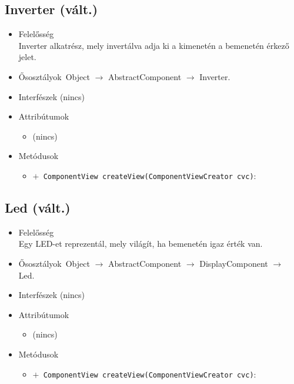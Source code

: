\subsection{Inverter (vált.)}
\begin{itemize}
\item Felelősség\\
Inverter alkatrész, mely invertálva adja ki a kimenetén a bemenetén  érkező jelet.
\item Ősosztályok\ Object $\rightarrow{}$ AbstractComponent $\rightarrow{}$ Inverter.
\item Interfészek (nincs)
\item Attribútumok $\ $
\begin{itemize}
\item (nincs)
\end{itemize}
\item Metódusok$\ $
\begin{itemize}
	\item[] \texttt{$+$ ComponentView createView(ComponentViewCreator cvc)}: 
\end{itemize}
\end{itemize}

\subsection{Led (vált.)}
\begin{itemize}
\item Felelősség\\
Egy LED-et reprezentál, mely világít, ha bemenetén igaz érték van.
\item Ősosztályok\ Object $\rightarrow{}$ AbstractComponent $\rightarrow{}$ DisplayComponent $\rightarrow{}$ Led.
\item Interfészek (nincs)
\item Attribútumok $\ $
\begin{itemize}
\item (nincs)
\end{itemize}
\item Metódusok$\ $
\begin{itemize}
	\item[] \texttt{$+$ ComponentView createView(ComponentViewCreator cvc)}: 
\end{itemize}
\end{itemize}

